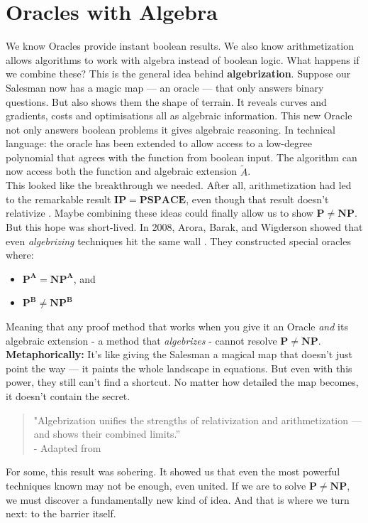 \documentclass[12pt]{report}
\begin{document}
\section{Oracles with Algebra}
We know Oracles provide instant boolean results.
We also know arithmetization allows algorithms to work with algebra instead of boolean logic. 
What happens if we combine these?
This is the general idea behind \textbf{algebrization}.
Suppose our Salesman now has a magic map --- an oracle --- that only answers binary questions.
But also shows them the shape of terrain.
It reveals curves and gradients, costs and optimisations all as algebraic information.
This new Oracle not only answers boolean problems it gives algebraic reasoning.
In technical language: the oracle has been extended to allow access to a low-degree polynomial that agrees with the function from boolean input.
The algorithm can now access both the function and algebraic extension $\tilde{A}$.\\
\vspace{0.3cm}
This looked like the breakthrough we needed.
After all, arithmetization had led to the remarkable result $\mathbf{IP = PSPACE}$, even though that result doesn't relativize \citep{arora2009}.
Maybe combining these ideas could finally allow us to show $\mathbf{P \ne NP}$.
But this hope was short-lived.
In 2008, Arora, Barak, and Wigderson showed that even \textit{algebrizing} techniques hit the same wall \citep{arora2008algebrization}.
They constructed special oracles where:
\begin{itemize}
    \item $\mathbf{P^A = NP^A}$, and
    \item $\mathbf{P^B \ne NP^B}$
\end{itemize}
Meaning that any proof method that works when you give it an Oracle \textit{and} its algebraic extension - a method that \textit{algebrizes} - cannot resolve $\mathbf{P \ne NP}$.\\
\vspace{0.3cm}
\textbf{Metaphorically:}  
It's like giving the Salesman a magical map that doesn't just point the way --- it paints the whole landscape in equations.
But even with this power, they still can't find a shortcut.
No matter how detailed the map becomes, it doesn't contain the secret.
\begin{quote}
    "Algebrization unifies the strengths of relativization and arithmetization --- and shows their combined limits.”\\
    - Adapted from \cite{arora2008algebrization}
\end{quote}
For some, this result was sobering.
It showed us that even the most powerful techniques known may not be enough, even united.
If we are to solve $\mathbf{P \ne NP}$, we must discover a fundamentally new kind of idea.
And that is where we turn next: to the barrier itself.
\end{document}
